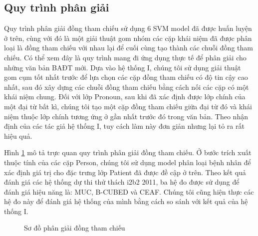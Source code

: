 \subsection*{Quy trình phân giải}
Quy trình phân giải đồng tham chiếu sử dụng 6 SVM model đã được huấn luyện ở trên, cùng với đó là một giải thuật gom nhóm các cặp khái niệm đã được phân loại là đồng tham chiếu với nhau lại để cuối cùng tạo thành các chuỗi đồng tham chiếu. Có thể xem đây là quy trình mang đi ứng dụng thực tế để phân giải cho những văn bản BAĐT mới. Dựa vào hệ thống I, chúng tôi sử dụng giải thuật gom cụm tốt nhất trước để lựa chọn các cặp đồng tham chiếu có độ tin cậy cao nhất, sau đó xây dựng các chuỗi đồng tham chiếu bằng cách nối các cặp có một khái niệm chung. Đối với lớp Pronoun, sau khi đã xác định được lớp chính của một đại từ bất kì, chúng tôi tạo một cặp đồng tham chiếu giữa đại từ đó và khái niệm thuộc lớp chính tương ứng ở gần nhất trước đó trong văn bản. Theo nhận định của các tác giả hệ thống I, tuy cách làm này đơn giản nhưng lại tỏ ra rất hiệu quả.

Hình \ref{fig:SDPG} mô tả trực quan quy trình phân giải đồng tham chiếu. Ở bước trích xuất thuộc tính của các cặp Person, chúng tôi sử dụng model phân loại bệnh nhân để xác định giá trị cho đặc trưng lớp Patient đã được đề cập ở trên. Theo kết quả đánh giá các hệ thống dự thi thử thách i2b2 2011, ba hệ đo được sử dụng để đánh giá hiệu năng là: MUC, B-CUBED và CEAF. Chúng tôi cũng hiện thực các hệ đo này để đánh giá hệ thống của mình bằng cách so sánh với kết quả của hệ thống I.

\begin{figure}[th]
\centering
{}
\caption{Sơ đồ phân giải đồng tham chiếu\label{fig:SDPG}}
\end{figure}

